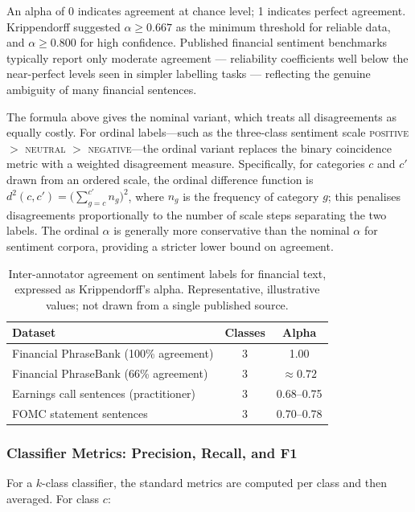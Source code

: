 An alpha of 0 indicates agreement at chance level; 1 indicates perfect agreement. Krippendorff suggested $\alpha \geq 0.667$ as the minimum threshold for reliable data, and $\alpha \geq 0.800$ for high confidence. Published financial sentiment benchmarks typically report only moderate agreement --- reliability coefficients well below the near-perfect levels seen in simpler labelling tasks --- reflecting the genuine ambiguity of many financial sentences.

The formula above gives the nominal variant, which treats all disagreements as equally costly. For ordinal labels---such as the three-class sentiment scale \textsc{positive} $>$ \textsc{neutral} $>$ \textsc{negative}---the ordinal variant replaces the binary coincidence metric with a weighted disagreement measure. Specifically, for categories $c$ and $c'$ drawn from an ordered scale, the ordinal difference function is $d^2(c,c') = \bigl(\sum_{g=c}^{c'} n_g\bigr)^2$, where $n_g$ is the frequency of category $g$; this penalises disagreements proportionally to the number of scale steps separating the two labels. The ordinal $\alpha$ is generally more conservative than the nominal $\alpha$ for sentiment corpora, providing a stricter lower bound on agreement.

\begin{table}[htbp]
  \centering
  \caption{Inter-annotator agreement on sentiment labels for financial text, expressed as Krippendorff's alpha. Representative, illustrative values; not drawn from a single published source.}
  \label{tab:krippendorff-benchmarks}
  \begin{tabular}{lcc}
    \toprule
    Dataset & Classes & Alpha \\
    \midrule
    Financial PhraseBank (100\% agreement) & 3 & 1.00 \\
    Financial PhraseBank (66\% agreement) & 3 & $\approx 0.72$ \\
    Earnings call sentences (practitioner) & 3 & 0.68--0.75 \\
    FOMC statement sentences & 3 & 0.70--0.78 \\
    \bottomrule
  \end{tabular}
\end{table}

\subsubsection*{Classifier Metrics: Precision, Recall, and F1}

For a $k$-class classifier, the standard metrics are computed per class and then averaged. For class $c$:

